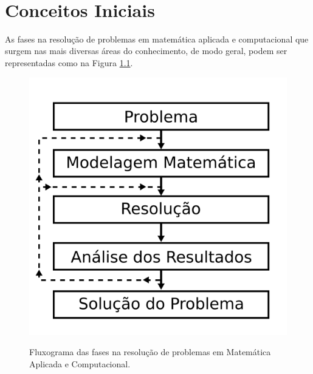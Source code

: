 \documentclass[
	12pt,				%
	openright,			%
	twoside,			%
	a4paper,			%
	english,			%
	french,				%
	brazil,				%
	sumario=tradicional
]{abntex2}
\numberwithin{example}{chapter}
\numberwithin{remark}{chapter}
\numberwithin{definition}{chapter}
\numberwithin{figure}{chapter}
\begin{document}
\frenchspacing

\frontmatter


\begin{titlingpage}
\phantom{xxx}
\vspace{0.5cm}
\huge
\raggedright
\vfill
\Huge
{\raggedleft
\textit{{\imprimirtitulo}}\\[1cm]
}
\centering 
\vfill
\end{titlingpage}

\tableofcontents*
\cleardoublepage


\mainmatter

\chapter{Conceitos Iniciais}

As fases na resolução de problemas em matemática aplicada e computacional que surgem nas mais diversas áreas do conhecimento, de modo geral, podem ser representadas como na Figura \ref{fig:fases_resolucao_problemas}.

\begin{figure}[h]
	\centering
	\caption{Fluxograma das fases na resolução de problemas em Matemática Aplicada e Computacional.}
	\includegraphics[scale=0.2]{figuras/figura_001}
	\label{fig:fases_resolucao_problemas}
\end{figure}
\end{document}
